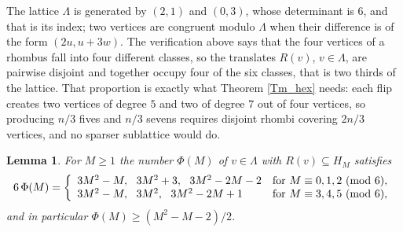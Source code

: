 \documentclass[12pt,a4paper]{article}%
\newtheorem{lemma}[theorem]{Lemma}
\begin{document}
The lattice $\Lambda $ is generated by $(2,1)$ and $(0,3)$, whose determinant is
$6$, and that is its index; two vertices are congruent modulo $\Lambda $ when
their difference is of the form $(2u,u+3w)$. The verification above says that
the four vertices of a rhombus fall into four different classes, so the
translates $R(v)$, $v\in \Lambda $, are pairwise disjoint and together occupy
four of the six classes, that is two thirds of the lattice. That proportion is
exactly what Theorem \ref{Tm_hex} needs: each flip creates two vertices of
degree $5$ and two of degree $7$ out of four vertices, so producing $n/3$ fives
and $n/3$ sevens requires disjoint rhombi covering $2n/3$ vertices, and no
sparser sublattice would do.
%



\begin{lemma}
\label{Lemma_rhombi}For $M\geq 1$ the number $\Phi (M)$ of $v\in \Lambda $ with
$R(v)\subseteq H_{M}$ satisfies
\[
6\,\Phi (M)=\left\{
\begin{array}
[c]{ll}%
3M^{2}-M,\ \ 3M^{2}+3,\ \ 3M^{2}-2M-2 & \text{for }M\equiv 0,1,2\ (\mathrm{mod}\ 6),\\
3M^{2}-M,\ \ 3M^{2},\ \ 3M^{2}-2M+1 & \text{for }M\equiv 3,4,5\ (\mathrm{mod}\ 6),
\end{array}
\right.
\]
and in particular $\Phi (M)\geq (M^{2}-M-2)/2$.
\end{lemma}
\end{document}
